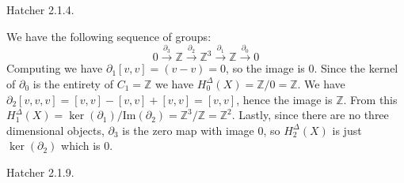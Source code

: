 \documentclass{book}                                                           %
\begin{document}
\begin{problem}
    Hatcher 2.1.4.
\end{problem}
\begin{solution}
    We have the following sequence of groups:
    \begin{equation*}
        0\overset{\partial_{3}}{\longrightarrow}\mathbb{Z}
        \overset{\partial_{2}}{\longrightarrow}\mathbb{Z}^{3}
        \overset{\partial_{1}}{\longrightarrow}\mathbb{Z}
        \overset{\partial_{0}}{\longrightarrow}{0}
    \end{equation*}
    Computing we have $\partial_{1}[v,v]=(v-v)=0$, so the image is $0$.
    Since the kernel of $\partial_{0}$ is the entirety of $C_{1}=\mathbb{Z}$
    we have $H_{0}^{\Delta}(X)=\mathbb{Z}/0=\mathbb{Z}$. We have
    $\partial_{2}[v,v,v]=[v,v]-[v,v]+[v,v]=[v,v]$, hence the image is
    $\mathbb{Z}$. From this
    $H_{1}^{\Delta}(X)=\ker(\partial_{1})/\textrm{Im}(\partial_{2})=\mathbb{Z}^{3}/\mathbb{Z}=\mathbb{Z}^{2}$.
    Lastly, since there are no three dimensional objects, $\partial_{3}$ is the
    zero map with image $0$, so $H_{2}^{\Delta}(X)$ is just $\ker(\partial_{2})$ which is 0.
\end{solution}
\begin{problem}
    Hatcher 2.1.9.
\end{problem}
\end{document}
